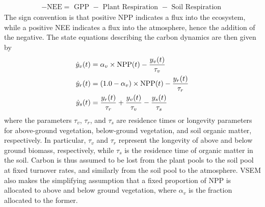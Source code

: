 \documentclass[12pt]{article}
\begin{document}
\begin{align}
-\text{NEE} = \text{ GPP } - \text{ Plant Respiration } - \text{ Soil Respiration } 
\end{align}
The sign convention is that positive NPP indicates a flux into the ecosystem, while a positive NEE indicates a flux into the atmosphere, hence the addition of the negative. 
The state equations describing the carbon dynamics are then given by
\begin{align}
\dot{y}_v(t) &= \alpha_v \times \text{NPP}(t) - \frac{y_v(t)}{\tau_v} \label{VSEM_ODE_system} \\
\dot{y}_r(t) &= (1.0 - \alpha_v) \times \text{NPP}(t) - \frac{y_r(t)}{\tau_r} \nonumber \\
\dot{y}_s(t) &= \frac{y_r(t)}{\tau_r} + \frac{y_v(t)}{\tau_v} - \frac{y_s(t)}{\tau_s} \nonumber 
\end{align}
where the parameters $\tau_v$, $\tau_r$, and $\tau_s$ are residence times or longevity parameters for above-ground vegetation, below-ground vegetation, and soil organic matter, 
respectively. In particular, $\tau_v$ and $\tau_r$ represent the longevity of above and below ground biomass, respectively, while $\tau_s$ is the residence time of organic matter 
in the soil. Carbon is thus assumed to be lost from the plant pools to the soil pool at fixed turnover rates, and similarly from the soil pool to the atmosphere. VSEM also makes the simplifying assumption that a fixed proportion of NPP is allocated to above and below ground vegetation, where $\alpha_v$ is the fraction
allocated to the former. 
\end{document}
